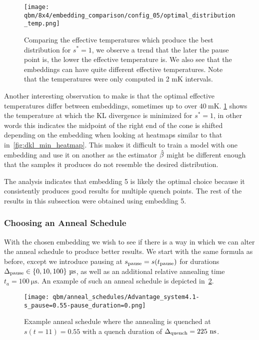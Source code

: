 \begin{figure}[!htb]
    \begin{center}
        \texttt{[image: qbm/8x4/embedding\_comparison/config\_05/optimal\_distribution\_temp.png]}
    \end{center}
    \caption{Comparing the effective temperatures which produce the best distribution for \( s^* = 1 \), we observe a trend that the later the pause point is, the lower the effective temperature is. We also see that the embeddings can have quite different effective temperatures. Note that the temperatures were only computed in 2 \si{\milli\kelvin} intervals.}
    \label{fig:optimal_distribution_temp}
\end{figure}

Another interesting observation to make is that the optimal effective temperatures differ between embeddings, sometimes up to over \( 40 \ \si{\milli\kelvin} \).
\cref{fig:optimal_distribution_temp} shows the temperature at which the KL divergence is minimized for \( s^* = 1 \), in other words this indicates the midpoint of the right end of the cone is shifted depending on the embedding when looking at heatmaps similar to that in~\cref{fig:dkl_min_heatmap}.
This makes it difficult to train a model with one embedding and use it on another as the estimator \( \hat{\beta} \) might be different enough that the samples it produces do not resemble the desired distribution.

The analysis indicates that embedding 5 is likely the optimal choice because it consistently produces good results for multiple quench points.
The rest of the results in this subsection were obtained using embedding 5.

\subsubsection{Choosing an Anneal Schedule}
With the chosen embedding we wish to see if there is a way in which we can alter the anneal schedule to produce better results.
We start with the same formula as before, except we introduce pausing at \( s_{\text{pause}} = s(t_{\text{pause}}) \) for durations \( \Deltapause \in \{ 0, 10, 100 \} \ \si{\micro\second} \), as well as an additional relative annealing time \( t_a = 100 \ \si{\micro\second} \).
An example of such an anneal schedule is depicted in~\cref{fig:anneal_schedule_example}.
\begin{figure}[!htb]
    \begin{center}
        \texttt{[image: qbm/anneal\_schedules/Advantage\_system4.1-s\_pause=0.55-pause\_duration=0.png]}
    \end{center}
    \caption{Example anneal schedule where the annealing is quenched at \( s(t = 11) = 0.55 \) with a quench duration of \( \Delta_{\text{quench}} = 225 \ \si{\nano\second} \).}
    \label{fig:anneal_schedule_example}
\end{figure}

